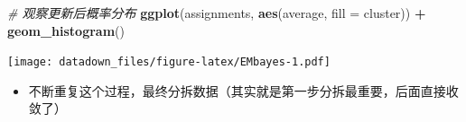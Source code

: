 \documentclass[
]{book}
\newenvironment{Shaded}{\begin{snugshade}}{\end{snugshade}}
\newcommand{\CommentTok}[1]{\textcolor[rgb]{0.56,0.35,0.01}{\textit{#1}}}
\newcommand{\DataTypeTok}[1]{\textcolor[rgb]{0.13,0.29,0.53}{#1}}
\newcommand{\KeywordTok}[1]{\textcolor[rgb]{0.13,0.29,0.53}{\textbf{#1}}}
\newcommand{\NormalTok}[1]{#1}
\newcommand{\OperatorTok}[1]{\textcolor[rgb]{0.81,0.36,0.00}{\textbf{#1}}}
\newcommand{\StringTok}[1]{\textcolor[rgb]{0.31,0.60,0.02}{#1}}
\providecommand{\tightlist}{%
  \setlength{\itemsep}{0pt}\setlength{\parskip}{0pt}}
\begin{document}
\begin{Shaded}
\begin{Highlighting}[]
\CommentTok{# 观察更新后概率分布}
\KeywordTok{ggplot}\NormalTok{(assignments, }\KeywordTok{aes}\NormalTok{(average, }\DataTypeTok{fill =}\NormalTok{ cluster)) }\OperatorTok{+}
\StringTok{  }\KeywordTok{geom_histogram}\NormalTok{()}
\end{Highlighting}
\end{Shaded}

\texttt{[image: datadown\_files/figure-latex/EMbayes-1.pdf]}

\begin{itemize}
\tightlist
\item
  不断重复这个过程，最终分拆数据（其实就是第一步分拆最重要，后面直接收敛了）
\end{itemize}
\end{document}
